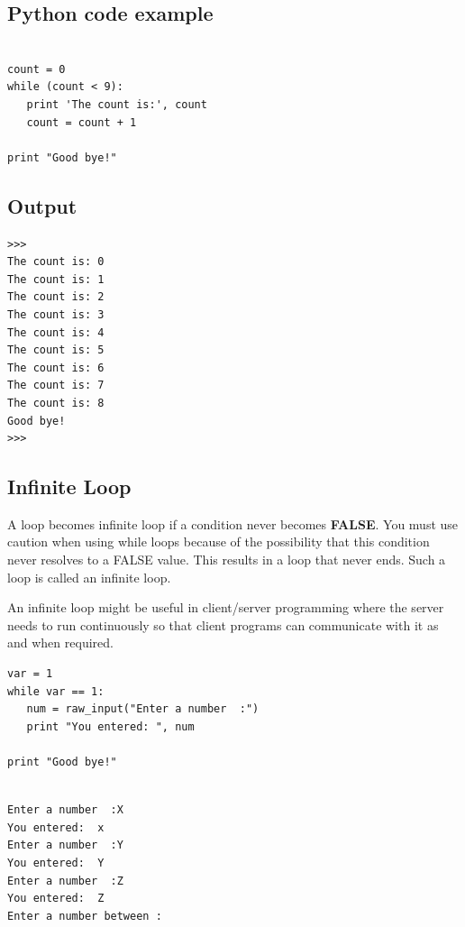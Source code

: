 \vspace{0.5cm}
\subsection{Python code example}
\begin{framed}
\begin{verbatim}

count = 0
while (count < 9):
   print 'The count is:', count
   count = count + 1

print "Good bye!"

\end{verbatim}
\end{framed}

\subsection{Output}
\begin{shaded}
\begin{verbatim}
>>> 
The count is: 0
The count is: 1
The count is: 2
The count is: 3
The count is: 4
The count is: 5
The count is: 6
The count is: 7
The count is: 8
Good bye!
>>> 
\end{verbatim}
\end{shaded}

\subsection{Infinite Loop}
A loop becomes {\color{red}infinite loop} if a condition never becomes {\textbf{FALSE}}. You must use caution when using while loops because of the possibility that this condition never resolves to a FALSE value. This results in a loop that never ends. Such a loop is called an infinite loop.

An infinite loop might be useful in client/server programming where the server needs to run continuously so that client programs can communicate with it as and when required.
\begin{framed}
\begin{verbatim}
var = 1
while var == 1:
   num = raw_input("Enter a number  :")
   print "You entered: ", num

print "Good bye!"
\end{verbatim}
\end{framed}

\begin{shaded}
\begin{verbatim}

Enter a number  :X
You entered:  x
Enter a number  :Y
You entered:  Y
Enter a number  :Z
You entered:  Z
Enter a number between :

\end{verbatim}
\end{shaded}

